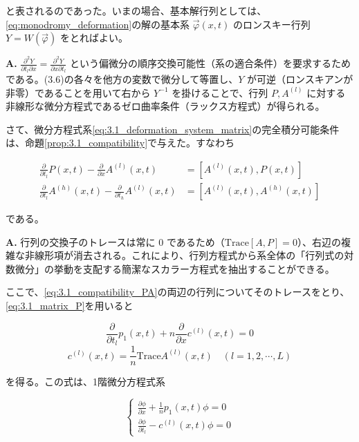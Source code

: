 と表されるのであった。いまの場合、基本解行列としては、\eqref{eq:monodromy_deformation}の解の基本系 $\vec{\varphi}(x,t)$ のロンスキー行列 $Y=W(\vec{\varphi})$ をとればよい。

\begin{Q}
\textbf{A.} $\frac{\partial^2 Y}{\partial t_l \partial x} = \frac{\partial^2 Y}{\partial x \partial t_l}$ という偏微分の順序交換可能性（系の適合条件）を要求するためである。(3.6)の各々を他方の変数で微分して等置し、$Y$ が可逆（ロンスキアンが非零）であることを用いて右から $Y^{-1}$ を掛けることで、行列 $P, A^{(l)}$ に対する非線形な微分方程式であるゼロ曲率条件（ラックス方程式）が得られる。
\end{Q}

さて、微分方程式系\eqref{eq:3.1_deformation_system_matrix}の完全積分可能条件は、命題\ref{prop:3.1_compatibility}で与えた。すなわち

\begin{align}
  \frac{\partial}{\partial t_l}P(x,t) - \frac{\partial}{\partial x}A^{(l)}(x,t) &= [A^{(l)}(x,t), P(x,t)]\\
  \frac{\partial}{\partial t_l}A^{(h)}(x,t) - \frac{\partial}{\partial t_h}A^{(l)}(x,t) &= [A^{(l)}(x,t), A^{(h)}(x,t)]
\end{align}

である。

\begin{Q}
\textbf{A.} 行列の交換子のトレースは常に $0$ であるため（$\mathrm{Trace}[A, P] = 0$）、右辺の複雑な非線形項が消去される。これにより、行列方程式から系全体の「行列式の対数微分」の挙動を支配する簡潔なスカラー方程式を抽出することができる。
\end{Q}

ここで、\eqref{eq:3.1_compatibility_PA}の両辺の行列についてそのトレースをとり、\eqref{eq:3.1_matrix_P}を用いると

\begin{equation}\label{eq:3.3_trace_compatibility}
  \frac{\partial}{\partial t_l}p_1(x,t) + n\frac{\partial}{\partial x}c^{(l)}(x,t) = 0
\end{equation}
\[
  c^{(l)}(x,t) = \frac{1}{n}\mathrm{Trace}A^{(l)}(x,t) \quad (l=1,2,\cdots,L)
\]

を得る。この式は、1階微分方程式系

\begin{equation}\label{eq:3.3_1-deformation_system}
  \begin{cases}
    \displaystyle \frac{\partial \phi}{\partial x} + \frac{1}{n}p_1(x,t)\phi = 0 \\[4mm]
    \displaystyle \frac{\partial \phi}{\partial t_l} - c^{(l)}(x,t)\phi = 0
  \end{cases}
\end{equation}

